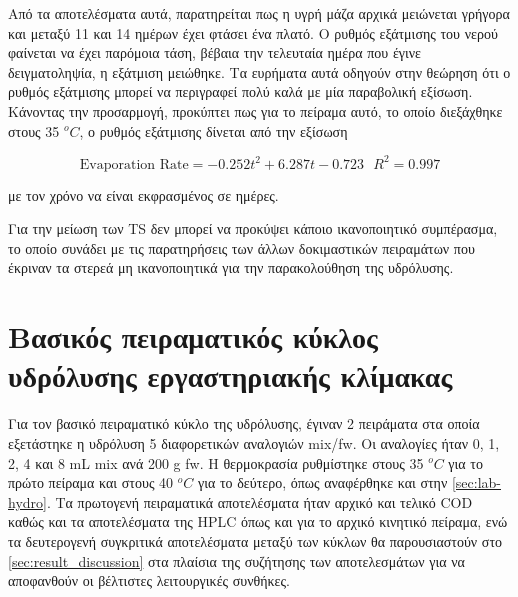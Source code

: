 \documentclass[11pt]{report}
\begin{document}
\begin{enumerate}
Από τα αποτελέσματα αυτά, παρατηρείται πως η υγρή μάζα αρχικά μειώνεται γρήγορα και μεταξύ 11 και 14 ημέρων έχει φτάσει ένα πλατό. Ο ρυθμός εξάτμισης του νερού φαίνεται να έχει παρόμοια τάση, βέβαια την τελευταία ημέρα που έγινε δειγματοληψία, η εξάτμιση μειώθηκε. Τα ευρήματα αυτά οδηγούν στην θεώρηση ότι ο ρυθμός εξάτμισης μπορεί να περιγραφεί πολύ καλά με μία παραβολική εξίσωση. Κάνοντας την προσαρμογή, προκύπτει πως για το πείραμα αυτό, το οποίο διεξάχθηκε στους 35 \(^oC\), ο ρυθμός εξάτμισης δίνεται από την εξίσωση

\[ \text{Evaporation Rate} = -0.252t^2 + 6.287t - 0.723 ~ ~ ~ R^2 = 0.997 \]

με τον χρόνο να είναι εκφρασμένος σε ημέρες.

Για την μείωση των TS δεν μπορεί να προκύψει κάποιο ικανοποιητικό συμπέρασμα, το οποίο συνάδει με τις παρατηρήσεις των άλλων δοκιμαστικών πειραμάτων που έκριναν τα στερεά μη ικανοποιητικά για την παρακολούθηση της υδρόλυσης.
\end{enumerate}

\section{Βασικός πειραματικός κύκλος υδρόλυσης εργαστηριακής κλίμακας}
\label{sec:org9858883}
Για τον βασικό πειραματικό κύκλο της υδρόλυσης, έγιναν 2 πειράματα στα οποία εξετάστηκε η υδρόλυση 5 διαφορετικών αναλογιών \acrshort{mix}/\acrshort{fw}. Οι αναλογίες ήταν 0, 1, 2, 4 και 8 mL \acrshort{mix} ανά 200 g \acrshort{fw}. Η θερμοκρασία ρυθμίστηκε στους 35 \(^oC\) για το πρώτο πείραμα και στους 40 \(^oC\) για το δεύτερο, όπως αναφέρθηκε και στην \autoref{sec:lab-hydro}. Τα πρωτογενή πειραματικά αποτελέσματα ήταν αρχικό και τελικό COD καθώς και τα αποτελέσματα της HPLC όπως και για το αρχικό κινητικό πείραμα, ενώ τα δευτερογενή συγκριτικά αποτελέσματα μεταξύ των κύκλων θα παρουσιαστούν στο \autoref{sec:result_discussion} στα πλαίσια της συζήτησης των αποτελεσμάτων για να αποφανθούν οι βέλτιστες λειτουργικές συνθήκες.
\end{document}

